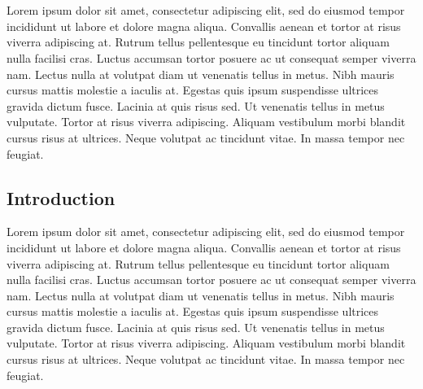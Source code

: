 \chapter{}
Lorem ipsum dolor sit amet, consectetur adipiscing elit, sed do eiusmod tempor incididunt ut labore et dolore magna aliqua. Convallis aenean et tortor at risus viverra adipiscing at. Rutrum tellus pellentesque eu tincidunt tortor aliquam nulla facilisi cras. Luctus accumsan tortor posuere ac ut consequat semper viverra nam. Lectus nulla at volutpat diam ut venenatis tellus in metus. Nibh mauris cursus mattis molestie a iaculis at. Egestas quis ipsum suspendisse ultrices gravida dictum fusce. Lacinia at quis risus sed. Ut venenatis tellus in metus vulputate. Tortor at risus viverra adipiscing. Aliquam vestibulum morbi blandit cursus risus at ultrices. Neque volutpat ac tincidunt vitae. In massa tempor nec feugiat.

\section{Introduction}
Lorem ipsum dolor sit amet, consectetur adipiscing elit, sed do eiusmod tempor incididunt ut labore et dolore magna aliqua. Convallis aenean et tortor at risus viverra adipiscing at. Rutrum tellus pellentesque eu tincidunt tortor aliquam nulla facilisi cras. Luctus accumsan tortor posuere ac ut consequat semper viverra nam. Lectus nulla at volutpat diam ut venenatis tellus in metus. Nibh mauris cursus mattis molestie a iaculis at. Egestas quis ipsum suspendisse ultrices gravida dictum fusce. Lacinia at quis risus sed. Ut venenatis tellus in metus vulputate. Tortor at risus viverra adipiscing. Aliquam vestibulum morbi blandit cursus risus at ultrices. Neque volutpat ac tincidunt vitae. In massa tempor nec feugiat.
